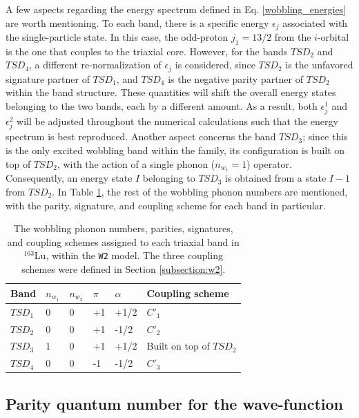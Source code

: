 \documentclass[myclassdoc,debug]{rjparticle}
\begin{document}
A few aspects regarding the energy spectrum defined in Eq. \ref{wobbling_energies} are worth mentioning. To each band, there is a specific energy $\epsilon_j$ associated with the single-particle state. In this case, the odd-proton $j_1=13/2$ from the $i$-orbital is the one that couples to the triaxial core. However, for the bands $TSD_2$ and $TSD_4$, a different re-normalization of $\epsilon_j$ is considered, since $TSD_2$ is the unfavored signature partner of $TSD_1$, and $TSD_4$ is the negative parity partner of $TSD_2$ within the band structure. These quantities will shift the overall energy states belonging to the two bands, each by a different amount. As a result, both $\epsilon_j^1$ and $\epsilon_j^2$ will be adjusted throughout the numerical calculations such that the energy spectrum is best reproduced. Another aspect concerns the band $TSD_3$; since this is the only excited wobbling band within the family, its configuration is built on top of $TSD_2$, with the action of a single phonon ($n_{w_1}=1$) operator. Consequently, an energy state $I$ belonging to $TSD_3$ is obtained from a state $I-1$ from $TSD_2$. In Table \ref{energy-states-tabular}, the rest of the wobbling phonon numbers are mentioned, with the parity, signature, and coupling scheme for each band in particular.

\begin{table}
\centering
\begin{tabular}{llllll}
\hline
Band & $n_{w_1}$ & $n_{w_2}$ & $\pi$ & $\alpha$ & Coupling scheme\\
\hline
\hline
   $TSD_1$  &   0        &    0       & +1      &    +1/2      &   $C'_1$              \\
   $TSD_2$  &     0      &      0     &   +1    &  -1/2        &   $C'_2$              \\
   $TSD_3$  &   1        &      0     &     +1  &     +1/2    &  Built on top of $TSD_2$                \\
   $TSD_4$  &    0       &      0     &      -1 &   -1/2       &    $C'_3$    \\       
   \hline
\end{tabular}
\caption{The wobbling phonon numbers, parities, signatures, and coupling schemes assigned to each triaxial band in $^{163}$Lu, within the \texttt{W2} model. The three coupling schemes were defined in Section \ref{subsection:w2}.}
\label{energy-states-tabular}
\end{table}

\subsection{Parity quantum number for the wave-function}
\end{document}

